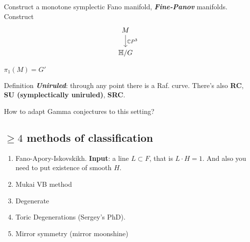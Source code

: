 Construct a monotone symplectic Fano manifold, \textit{\textbf{Fine-Panov}} manifolds. Construct
\[\begin{tikzcd}
M\arrow[d,"\mathbb{C}P^{3}"]\\
\mathbb{H}/G
\end{tikzcd}\]

\begin{coro}\leavevmode
	$\pi_{1}(M)=G'$
\end{coro}

\begin{thing4}{Definition}\leavevmode
\textit{\textbf{Uniruled}}: through any point there is a Raf. curve. There's also {\bfseries RC}, {\bfseries SU (symplectically uniruled)}, {\bfseries SRC}.
\end{thing4}

\begin{question}[Sergey]\leavevmode
	How to adapt Gamma conjectures to this setting?
\end{question}

\subsection{$\geq 4$ methods of classification}

\begin{enumerate}
\item Fano-Apory-Iskovskikh. \textbf{Input}: a line $L \subset F$, that is $L\cdot H=1$. And also you need to put existence of smooth $H$.

\item Mukai VB method
\item Degenerate
\item Toric Degenerations (Sergey's PhD).
\item Mirror symmetry (mirror moonshine)
\end{enumerate}


